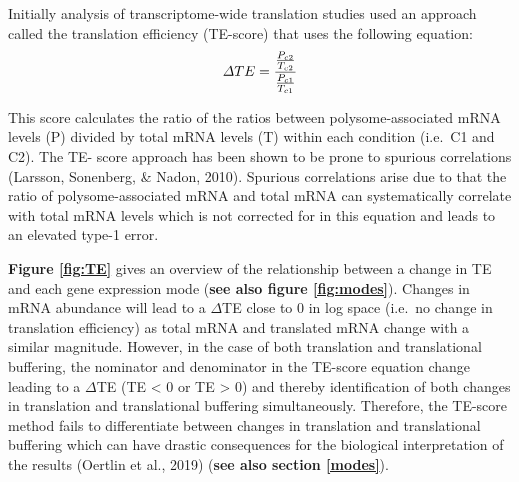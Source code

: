 \documentclass[
  12pt,
  openany]{book}
\begin{document}
Initially analysis of transcriptome-wide translation studies used an approach called the translation efficiency (TE-score) that uses the following equation:
\[\varDelta TE = \frac{\frac{P_{c2}}{T_{c2}}} {\frac{P_{c1}}{T_{c1}}}\\\]

This score calculates the ratio of the ratios between polysome-associated mRNA levels (P) divided by total mRNA levels (T) within each condition (i.e.~C1 and C2). The TE- score approach has been shown to be prone to spurious correlations (Larsson, Sonenberg, \& Nadon, 2010). Spurious correlations arise due to that the ratio of polysome-associated mRNA and total mRNA can systematically correlate with total mRNA levels which is not corrected for in this equation and leads to an elevated type-1 error.

\textbf{Figure \ref{fig:TE}} gives an overview of the relationship between a change in TE and each gene expression mode (\textbf{see also figure \ref{fig:modes}}). Changes in mRNA abundance will lead to a \(\varDelta\)TE close to 0 in log space (i.e.~no change in translation efficiency) as total mRNA and translated mRNA change with a similar magnitude. However, in the case of both translation and translational buffering, the nominator and denominator in the TE-score equation change leading to a \(\varDelta\)TE (TE \textless{} 0 or TE \textgreater{} 0) and thereby identification of both changes in translation and translational buffering simultaneously. Therefore, the TE-score method fails to differentiate between changes in translation and translational buffering which can have drastic consequences for the biological interpretation of the results (Oertlin et al., 2019) (\textbf{see also section \ref{modes}}).
\end{document}
